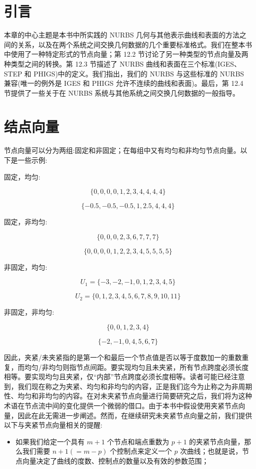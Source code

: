 \documentclass[../main.tex]{subfiles}
\begin{document}
\section{引言}

本章的中心主题是本书中所实践的 NURBS 几何与其他表示曲线和表面的方法之间的关系，以及在两个系统之间交换几何数据的几个重要标准格式。我们在整本书中使用了一种特定形式的节点向量；第 12.2 节讨论了另一种类型的节点向量及两种类型之间的转换。第 12.3 节描述了 NURBS 曲线和表面在三个标准(IGES、STEP 和 PHIGS)中的定义。我们指出，我们的 NURBS 与这些标准的 NURBS 兼容(唯一的例外是 IGES 和 PHIGS 允许不连续的曲线和表面)。最后，第 12.4 节提供了一些关于在 NURBS 系统与其他系统之间交换几何数据的一般指导。

\section{结点向量}
节点向量可以分为两组:固定和非固定；在每组中又有均匀和非均匀节点向量。以下是一些示例:

固定，均匀:

\[
\{ 0,0,0,0,1,2,3,4,4,4,4\}
\]

\[
\{  - {0.5}, - {0.5}, - {0.5},1,{2.5},4,4,4\}
\]

固定，非均匀:

\[
\{ 0,0,0,2,3,6,7,7,7\}
\]

\[
\{ 0,0,0,0,1,2,2,3,4,5,5,5,5\}
\]

非固定，均匀:

\[
{U}_{1} = \{  - 3, - 2, - 1,0,1,2,3,4,5\}
\]

\[
{U}_{2} = \{ 0,1,2,3,4,5,6,7,8,9,{10},{11}\}
\]

非固定，非均匀:

\[
\{ 0,0,1,2,3,4\}
\]

\[
\{  - 2, - 1,0,4,5,6,7\}
\]

因此，夹紧/未夹紧指的是第一个和最后一个节点值是否以等于度数加一的重数重复，而均匀/非均匀则指节点间距。要实现均匀且未夹紧，所有节点跨度必须长度相等。要实现均匀且夹紧，仅“内部”节点跨度必须长度相等。读者可能已经注意到，我们现在称之为夹紧、均匀和非均匀的内容，正是我们迄今为止称之为非周期性、均匀和非均匀的内容。在对未夹紧节点向量进行简要研究之后，我们将为这种术语在节点流中间的变化提供一个微弱的借口。由于本书中假设使用夹紧节点向量，因此在此无需进一步阐述。然而，在继续研究未夹紧节点向量之前，我们提供以下与夹紧节点向量相关的提醒:

\begin{itemize}
\item 如果我们给定一个具有 \(m + 1\) 个节点和端点重数为 \(p + 1\) 的夹紧节点向量，那么我们需要 \(n + 1\left( { = m - p}\right)\) 个控制点来定义一个 \(p\) 次曲线；也就是说，节点向量决定了曲线的度数、控制点的数量以及有效的参数范围；
\end{itemize}
\end{document}
